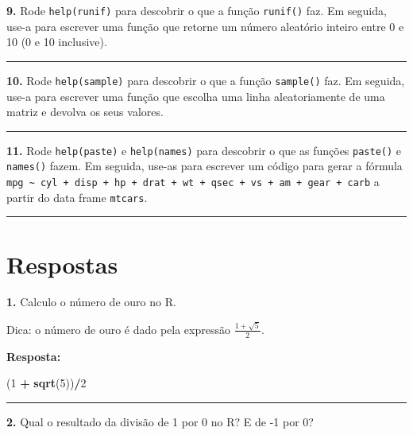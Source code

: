 \documentclass[
]{book}
\newenvironment{Shaded}{\begin{snugshade}}{\end{snugshade}}
\newcommand{\DecValTok}[1]{\textcolor[rgb]{0.00,0.00,0.81}{#1}}
\newcommand{\KeywordTok}[1]{\textcolor[rgb]{0.13,0.29,0.53}{\textbf{#1}}}
\newcommand{\NormalTok}[1]{#1}
\newcommand{\OperatorTok}[1]{\textcolor[rgb]{0.81,0.36,0.00}{\textbf{#1}}}
\newcommand{\StringTok}[1]{\textcolor[rgb]{0.31,0.60,0.02}{#1}}
\begin{document}
\textbf{9.} Rode \texttt{help(runif)} para descobrir o que a função \texttt{runif()} faz. Em seguida, use-a para escrever uma função que retorne um número aleatório inteiro entre 0 e 10 (0 e 10 inclusive).

\begin{center}\rule{0.5\linewidth}{0.5pt}\end{center}

\textbf{10.} Rode \texttt{help(sample)} para descobrir o que a função \texttt{sample()} faz. Em seguida, use-a para escrever uma função que escolha uma linha aleatoriamente de uma matriz e devolva os seus valores.

\begin{center}\rule{0.5\linewidth}{0.5pt}\end{center}

\textbf{11.} Rode \texttt{help(paste)} e \texttt{help(names)} para descobrir o que as funções \texttt{paste()} e \texttt{names()} fazem. Em seguida, use-as para escrever um código para gerar a fórmula \texttt{mpg\ \textasciitilde{}\ cyl\ +\ disp\ +\ hp\ +\ drat\ +\ wt\ +\ qsec\ +\ vs\ +\ am\ +\ gear\ +\ carb} a partir do data frame \texttt{mtcars}.

\begin{center}\rule{0.5\linewidth}{0.5pt}\end{center}

\hypertarget{respostas}{%
\section{Respostas}\label{respostas}}

\textbf{1.} Calculo o número de ouro no R.

Dica: o número de ouro é dado pela expressão \(\frac{1 + \sqrt{5}}{2}\).

\textbf{Resposta:}

\begin{Shaded}
\begin{Highlighting}[]
\NormalTok{(}\DecValTok{1} \OperatorTok{+}\StringTok{ }\KeywordTok{sqrt}\NormalTok{(}\DecValTok{5}\NormalTok{))}\OperatorTok{/}\DecValTok{2}
\end{Highlighting}
\end{Shaded}

\begin{center}\rule{0.5\linewidth}{0.5pt}\end{center}

\textbf{2.} Qual o resultado da divisão de 1 por 0 no R? E de -1 por 0?
\end{document}
